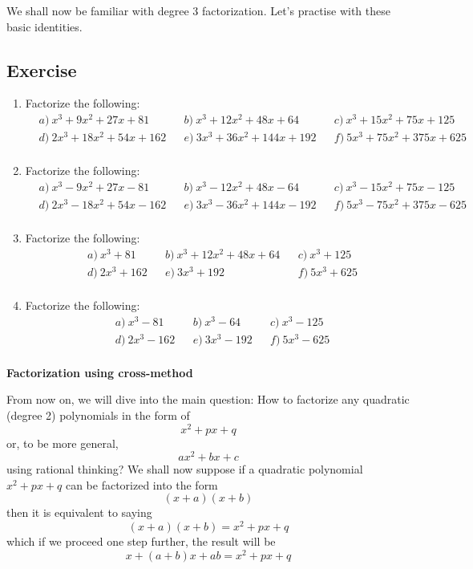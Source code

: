 \documentclass[12pt]{article}
\begin{document}
    We shall now be familiar with degree 3 factorization. Let's practise with these basic identities.

    \subsection*{Exercise}
    \begin{enumerate}
        \item Factorize the following:\begin{align*}
            &a)\ x^3+9x^2+27x+81&&b)\ x^3+12x^2+48x+64&&c)\ x^3+15x^2+75x+125\\
            &d)\ 2x^3+18x^2+54x+162&&e)\ 3x^3+36x^2+144x+192&&f)\ 5x^3+75x^2+375x+625\\
        \end{align*}
        \item Factorize the following:\begin{align*}
            &a)\ x^3-9x^2+27x-81&&b)\ x^3-12x^2+48x-64&&c)\ x^3-15x^2+75x-125\\
            &d)\ 2x^3-18x^2+54x-162&&e)\ 3x^3-36x^2+144x-192&&f)\ 5x^3-75x^2+375x-625\\
        \end{align*}
        \item Factorize the following:\begin{align*}
            &a)\ x^3+81&&b)\ x^3+12x^2+48x+64&&c)\ x^3+125\\
            &d)\ 2x^3+162&&e)\ 3x^3+192&&f)\ 5x^3+625\\
        \end{align*}
        \item Factorize the following:\begin{align*}
            &a)\ x^3-81&&b)\ x^3-64&&c)\ x^3-125\\
            &d)\ 2x^3-162&&e)\ 3x^3-192&&f)\ 5x^3-625\\
        \end{align*}
    \end{enumerate}

    \begin{center}
        \textbf{Factorization using cross-method}
    \end{center}

    From now on, we will dive into the main question: How to factorize any quadratic (degree 2) polynomials in the form of $$x^2+px+q$$ or, to be more general, $$ax^2+bx+c$$ using rational thinking? We shall now suppose if a quadratic polynomial $x^2+px+q$ can be factorized into the form $$(x+a)(x+b)$$ then it is equivalent to saying $$(x+a)(x+b)=x^2+px+q$$ which if we proceed one step further, the result will be $$x+(a+b)x+ab=x^2+px+q$$
\end{document}
